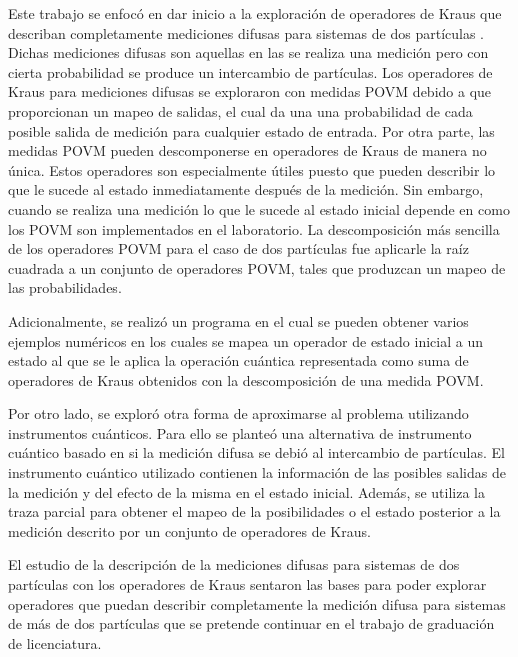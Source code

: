 Este trabajo se enfocó en dar inicio a la exploración de operadores de Kraus que describan completamente mediciones difusas para sistemas de dos partículas 
. Dichas mediciones difusas son aquellas en las se realiza una medición pero con cierta probabilidad se produce un intercambio de partículas.    %
Los operadores de Kraus para mediciones difusas se exploraron con medidas POVM debido a que proporcionan un mapeo de salidas, el cual da una una probabilidad de cada posible salida de medición para cualquier estado de entrada. Por otra parte, las medidas POVM pueden descomponerse en operadores de Kraus de manera no única. Estos operadores son especialmente útiles puesto que pueden describir lo que le sucede al estado inmediatamente después de la medición. Sin embargo, cuando se realiza una medición lo que le sucede al estado inicial depende en como los POVM son implementados en el laboratorio. La descomposición más sencilla de los operadores POVM para el caso de dos partículas fue aplicarle la raíz cuadrada a un conjunto de operadores POVM, tales que produzcan un mapeo de las probabilidades. 

Adicionalmente, se realizó un programa en el cual se pueden obtener varios ejemplos numéricos en los cuales se mapea un operador de estado inicial a un estado al que se le aplica la operación cuántica representada como suma de operadores de Kraus obtenidos con la descomposición de una medida POVM\@.

Por otro lado, se exploró otra forma de aproximarse al problema utilizando instrumentos cuánticos. Para ello se planteó una alternativa de instrumento cuántico basado en si la medición difusa se debió al intercambio de partículas. %
 El instrumento cuántico utilizado contienen la información de las posibles salidas de la medición  y del efecto de la misma en el estado inicial. Además, se utiliza la traza parcial para obtener el mapeo de la posibilidades o el estado posterior a la medición descrito por un conjunto de operadores de Kraus.

El estudio de la descripción de la mediciones difusas para sistemas de dos partículas con los operadores de Kraus sentaron las bases para poder explorar operadores que puedan describir completamente la medición difusa para sistemas de más de dos partículas que se pretende continuar en el trabajo de graduación de licenciatura.
